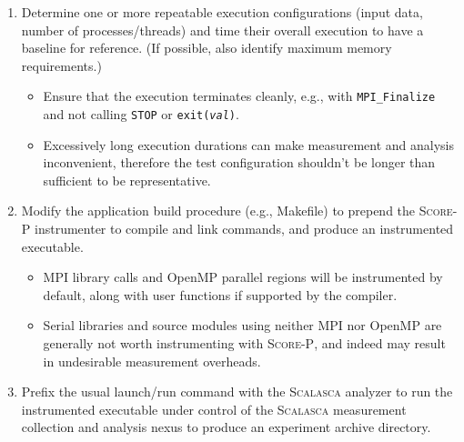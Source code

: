 \documentclass[a4paper]{article}
\newcommand{\Scalasca}{\textsc{Scalasca}\xspace}
\newcommand{\Scorep}{\textsc{Score-P}\xspace}
\begin{document}
\begin{enumerate}

\item Determine one or more repeatable execution configurations (input
data, number of processes/threads) and time their overall execution to
have a baseline for reference.  (If possible, also identify maximum
memory requirements.)
\begin{itemize}
\item Ensure that the execution terminates cleanly, e.g., with
    \verb+MPI_Finalize+ and not calling \texttt{STOP} or
    \texttt{exit(\mbox{\rmfamily\itshape val})}.
\item Excessively long execution durations can make
measurement and analysis inconvenient, therefore the test configuration
shouldn't be longer than sufficient to be representative.
\end{itemize}

\item Modify the application build procedure (e.g., Makefile) to prepend the
\Scorep instrumenter to compile and link commands, and produce an
instrumented executable.

\begin{itemize}
\item MPI library calls and OpenMP parallel regions will be instrumented by
default, along with user functions if supported by the compiler.
\item Serial libraries and source modules using neither MPI nor OpenMP
are generally not worth instrumenting with \Scorep, and indeed may result in
undesirable measurement overheads.
\end{itemize}

\item Prefix the usual launch/run command with the \Scalasca analyzer to
run the instrumented executable under control of the \Scalasca
measurement collection and analysis nexus to produce an experiment
archive directory.


\end{enumerate}
\end{document}
